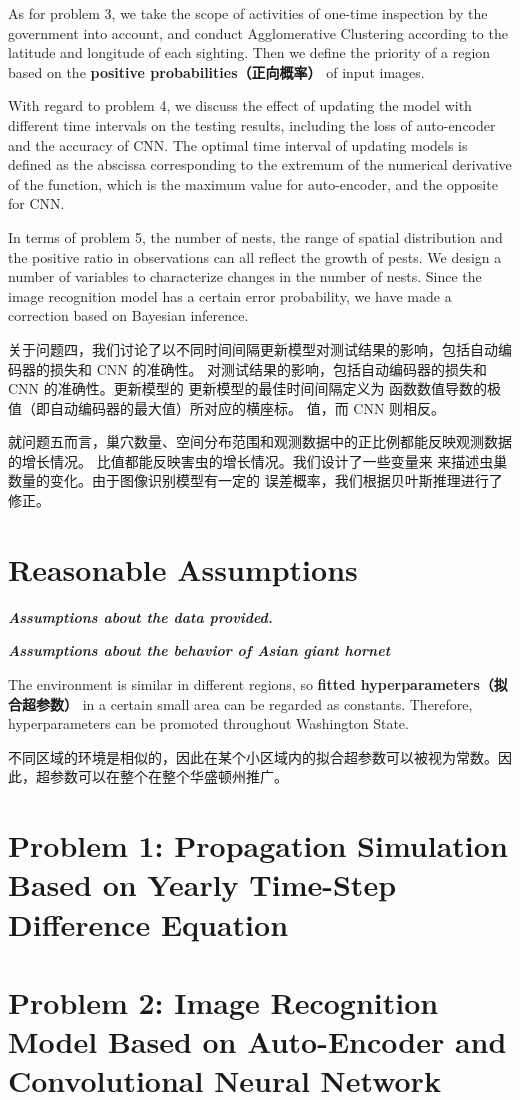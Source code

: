 \documentclass[12pt]{ctexart}
\begin{document}
As for problem 3, we take the scope of activities of one-time inspection by the government
into account, and conduct Agglomerative Clustering according to the latitude and longitude
of each sighting. Then we define the priority of a region based on the \textbf{positive probabilities（正向概率）} of
input images.

With regard to problem 4, we discuss the effect of updating the model with different time
intervals on the testing results, including the loss of auto-encoder and the accuracy of CNN. The
optimal time interval of updating models is defined as the abscissa corresponding
to the extremum of the numerical derivative of the function, which is the maximum
value for auto-encoder, and the opposite for CNN.

In terms of problem 5, the number of nests, the range of spatial distribution and the positive
ratio in observations can all reflect the growth of pests. We design a number of variables to
characterize changes in the number of nests. Since the image recognition model has a certain
error probability, we have made a correction based on Bayesian inference.

关于问题四，我们讨论了以不同时间间隔更新模型对测试结果的影响，包括自动编码器的损失和 CNN 的准确性。
对测试结果的影响，包括自动编码器的损失和 CNN 的准确性。更新模型的
更新模型的最佳时间间隔定义为
函数数值导数的极值（即自动编码器的最大值）所对应的横座标。
值，而 CNN 则相反。

就问题五而言，巢穴数量、空间分布范围和观测数据中的正比例都能反映观测数据的增长情况。
比值都能反映害虫的增长情况。我们设计了一些变量来
来描述虫巢数量的变化。由于图像识别模型有一定的
误差概率，我们根据贝叶斯推理进行了修正。
\section{Reasonable Assumptions}
\textbf{\textit{Assumptions about the data provided.}}

\textbf{\textit{Assumptions about the behavior of Asian giant hornet}}

The environment is similar in different regions, so \textbf{fitted hyperparameters（拟合超参数）} in a certain
small area can be regarded as constants. Therefore, hyperparameters can be promoted
throughout Washington State.

不同区域的环境是相似的，因此在某个小区域内的拟合超参数可以被视为常数。因此，超参数可以在整个在整个华盛顿州推广。
\section{Problem 1: Propagation Simulation Based on Yearly
Time-Step Difference Equation}

\section{Problem 2: Image Recognition Model Based on Auto-Encoder
 and Convolutional Neural Network}

\end{document}
